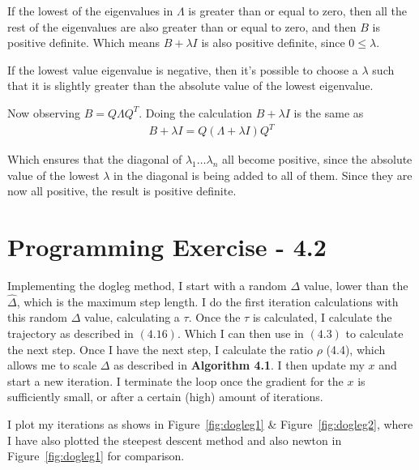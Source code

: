 \documentclass[11pt]{article} %
\begin{document}
If the lowest of the eigenvalues in $\Lambda$ is greater than or equal to zero, then all the rest of the eigenvalues are also greater than or equal to zero, and then $B$ is positive definite. Which means $B + \lambda I$ is also positive definite, since $ 0 \leq \lambda$.

If the lowest value eigenvalue is negative, then it's possible to choose a $\lambda$ such that it is slightly greater than the absolute value of the lowest eigenvalue. 

Now observing $B = Q \Lambda Q^T$. Doing the calculation $B + \lambda I$ is the same as
\begin{gather*}
B + \lambda I = Q(\Lambda + \lambda I)Q^T
\end{gather*}

Which ensures that the diagonal of $\lambda_1 \dots \lambda_n$ all become positive, since the absolute value of the lowest $\lambda$ in the diagonal is being added to all of them.
Since they are now all positive, the result is positive definite.
\newpage
\section*{Programming Exercise - 4.2}
Implementing the dogleg method, I start with a random $\Delta$ value, lower than the $\hat{\Delta}$, which is the maximum step length. I do the first iteration calculations with this random $\Delta$ value, calculating a $\tau$. Once the $\tau$ is calculated, I calculate the trajectory as described in $(4.16)$. Which I can then use in $(4.3)$ to calculate the next step.
Once I have the next step, I calculate the ratio $\rho$ (4.4), which allows me to scale $\Delta$ as described in \textbf{Algorithm 4.1}. I then update my $x$ and start a new iteration. I terminate the loop once the gradient for the $x$ is sufficiently small, or after a certain (high) amount of iterations.

I plot my iterations as shows in Figure~\ref{fig:dogleg1} \& Figure~\ref{fig:dogleg2}, where I have also plotted the steepest descent method and also newton in Figure~\ref{fig:dogleg1} for comparison.
\end{document}
